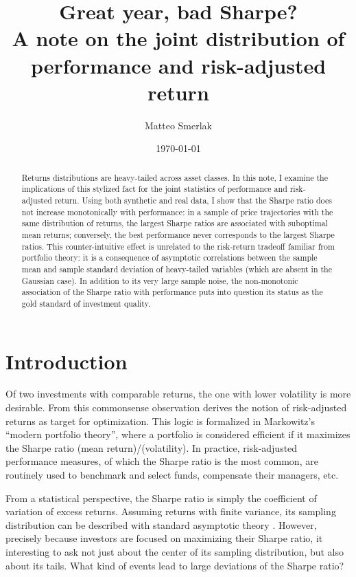 \documentclass[
reprint,
amsmath,amssymb,
aps,
]{revtex4-2}
\begin{document}
\title{Great year, bad Sharpe?\\ A note on the joint distribution of performance and risk-adjusted return}

\author{Matteo Smerlak}

\date{\today}

\begin{abstract}
    Returns distributions are heavy-tailed across asset classes. 
    In this note, I examine the implications of this stylized fact for the joint statistics of performance and risk-adjusted return. 
    Using both synthetic and real data, I show that the Sharpe ratio does not increase monotonically with performance: in a sample of price trajectories with the same distribution of returns, the largest Sharpe ratios are associated with suboptimal mean returns; conversely, the best performance never corresponds to the largest Sharpe ratios. 
    This counter-intuitive effect is unrelated to the risk-return tradeoff familiar from portfolio theory: it is a consequence of asymptotic correlations between the sample mean and sample standard deviation of heavy-tailed variables (which are absent in the Gaussian case). 
    In addition to its very large sample noise, the non-monotonic association of the Sharpe ratio with performance puts into question its status as the gold standard of investment quality. 
 \end{abstract}

\maketitle 

\section{Introduction}

Of two investments with comparable returns, the one with lower volatility is more desirable. 
From this commonsense observation derives the notion of risk-adjusted returns as target for optimization. 
This logic is formalized in Markowitz's ``modern portfolio theory'', where a portfolio is considered efficient if it maximizes the Sharpe ratio (mean return)/(volatility). 
In practice, risk-adjusted performance measures, of which the Sharpe ratio is the most common, are routinely used to benchmark and select funds, compensate their managers, etc.

From a statistical perspective, the Sharpe ratio is simply the coefficient of variation of excess returns. 
Assuming returns with finite variance, its sampling distribution can be described with standard asymptotic theory \cite{loStatistics2002}. 
However, precisely because investors are focused on maximizing their Sharpe ratio, it interesting to ask not just about the center of its sampling distribution, but also about its tails. 
What kind of events lead to large deviations of the Sharpe ratio? 
\end{document}
